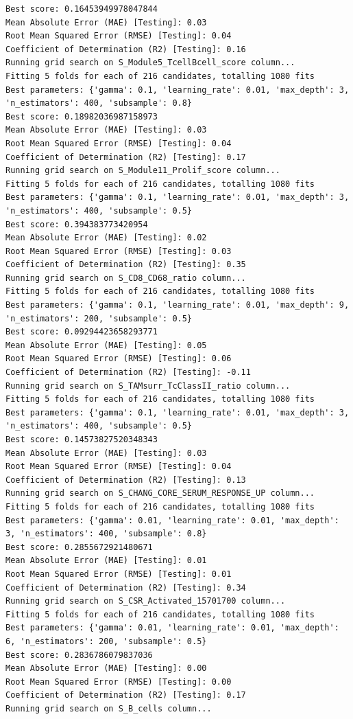 \documentclass[
  letterpaper,
  DIV=11,
  numbers=noendperiod]{scrartcl}
\begin{document}
\begin{verbatim}
Best score: 0.16453949978047844
Mean Absolute Error (MAE) [Testing]: 0.03
Root Mean Squared Error (RMSE) [Testing]: 0.04
Coefficient of Determination (R2) [Testing]: 0.16
Running grid search on S_Module5_TcellBcell_score column...
Fitting 5 folds for each of 216 candidates, totalling 1080 fits
Best parameters: {'gamma': 0.1, 'learning_rate': 0.01, 'max_depth': 3, 'n_estimators': 400, 'subsample': 0.8}
Best score: 0.18982036987158973
Mean Absolute Error (MAE) [Testing]: 0.03
Root Mean Squared Error (RMSE) [Testing]: 0.04
Coefficient of Determination (R2) [Testing]: 0.17
Running grid search on S_Module11_Prolif_score column...
Fitting 5 folds for each of 216 candidates, totalling 1080 fits
Best parameters: {'gamma': 0.1, 'learning_rate': 0.01, 'max_depth': 3, 'n_estimators': 400, 'subsample': 0.5}
Best score: 0.394383773420954
Mean Absolute Error (MAE) [Testing]: 0.02
Root Mean Squared Error (RMSE) [Testing]: 0.03
Coefficient of Determination (R2) [Testing]: 0.35
Running grid search on S_CD8_CD68_ratio column...
Fitting 5 folds for each of 216 candidates, totalling 1080 fits
Best parameters: {'gamma': 0.1, 'learning_rate': 0.01, 'max_depth': 9, 'n_estimators': 200, 'subsample': 0.5}
Best score: 0.09294423658293771
Mean Absolute Error (MAE) [Testing]: 0.05
Root Mean Squared Error (RMSE) [Testing]: 0.06
Coefficient of Determination (R2) [Testing]: -0.11
Running grid search on S_TAMsurr_TcClassII_ratio column...
Fitting 5 folds for each of 216 candidates, totalling 1080 fits
Best parameters: {'gamma': 0.1, 'learning_rate': 0.01, 'max_depth': 3, 'n_estimators': 400, 'subsample': 0.5}
Best score: 0.14573827520348343
Mean Absolute Error (MAE) [Testing]: 0.03
Root Mean Squared Error (RMSE) [Testing]: 0.04
Coefficient of Determination (R2) [Testing]: 0.13
Running grid search on S_CHANG_CORE_SERUM_RESPONSE_UP column...
Fitting 5 folds for each of 216 candidates, totalling 1080 fits
Best parameters: {'gamma': 0.01, 'learning_rate': 0.01, 'max_depth': 3, 'n_estimators': 400, 'subsample': 0.8}
Best score: 0.2855672921480671
Mean Absolute Error (MAE) [Testing]: 0.01
Root Mean Squared Error (RMSE) [Testing]: 0.01
Coefficient of Determination (R2) [Testing]: 0.34
Running grid search on S_CSR_Activated_15701700 column...
Fitting 5 folds for each of 216 candidates, totalling 1080 fits
Best parameters: {'gamma': 0.01, 'learning_rate': 0.01, 'max_depth': 6, 'n_estimators': 200, 'subsample': 0.5}
Best score: 0.2836786079837036
Mean Absolute Error (MAE) [Testing]: 0.00
Root Mean Squared Error (RMSE) [Testing]: 0.00
Coefficient of Determination (R2) [Testing]: 0.17
Running grid search on S_B_cells column...

\end{verbatim}
\end{document}
